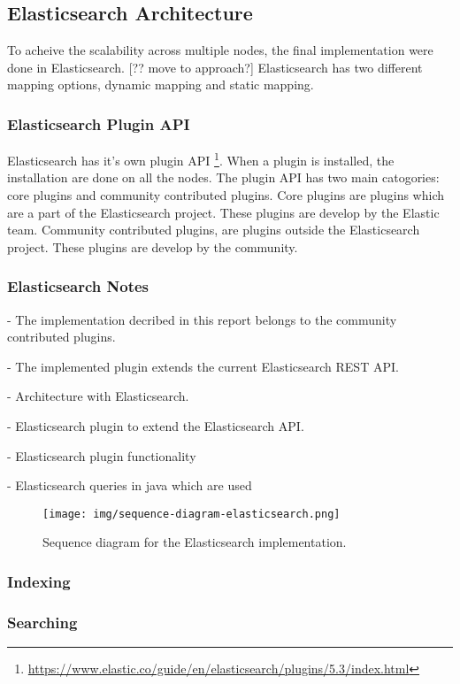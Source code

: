 \subsection{Elasticsearch Architecture}
To acheive the scalability across multiple nodes, the final implementation were done in Elasticsearch.
[?? move to approach?]
Elasticsearch has two different mapping options, dynamic mapping and static mapping.

\subsubsection{Elasticsearch Plugin API}
Elasticsearch has it's own plugin API \footnote{\url{https://www.elastic.co/guide/en/elasticsearch/plugins/5.3/index.html}}.
When a plugin is installed, the installation are done on all the nodes.
The plugin API has two main catogories: core plugins and community contributed plugins.
Core plugins are plugins which are a part of the Elasticsearch project.
These plugins are develop by the Elastic team.
Community contributed plugins, are plugins outside the Elasticsearch project.
These plugins are develop by the community.

\subsubsection{Elasticsearch Notes}
- The implementation decribed in this report belongs to the community contributed plugins.

- The implemented plugin extends the current Elasticsearch REST API.

- Architecture with Elasticsearch.

- Elasticsearch plugin to extend the Elasticsearch API.

- Elasticsearch plugin functionality

- Elasticsearch queries in java which are used

\begin{figure}[h!]
\centering \texttt{[image: img/sequence-diagram-elasticsearch.png]}
\caption{Sequence diagram for the Elasticsearch implementation.}
\label{fig:sequence-diagram-lucene}
\end{figure}

\subsubsection{Indexing}
\subsubsection{Searching}
